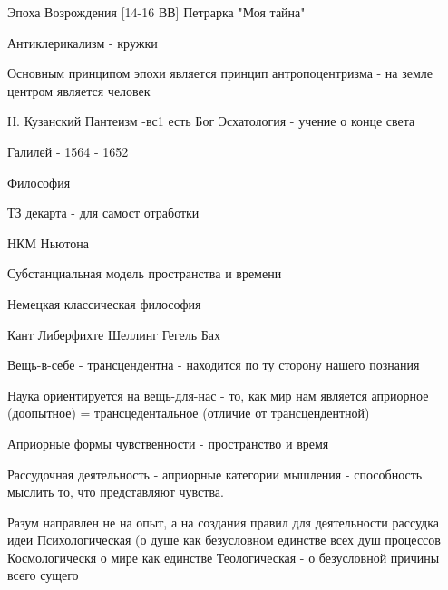 \documentclass[a4paper,12pt]{report}
\begin{document}
	Эпоха Возрождения [14-16 ВВ]
	Петрарка "Моя тайна"
	
	
	Антиклерикализм - кружки
	
	Основным принципом эпохи является принцип антропоцентризма - на земле центром является человек
	
	Н. Кузанский 
	Пантеизм -вс1 есть Бог
	Эсхатология - учение о конце света
	
	
	
	Галилей - 1564 - 1652
	
	Философия 
	
	ТЗ декарта  - для самост отработки
	
	
	НКМ Ньютона
	
	Субстанциальная модель пространства и времени
	
	
	Немецкая классическая философия
	
	Кант Либерфихте
	Шеллинг
	Гегель
	Бах
	
	
	Вещь-в-себе - трансцендентна - находится по ту сторону нашего познания
	
	Наука ориентируется на вещь-для-нас - то, как мир нам является
	априорное (доопытное) = трансцедентальное (отличие от трансцендентной)
	
	Априорные формы чувственности - пространство и время
	
	Рассудочная деятельность - априорные категории мышления - способность мыслить то, что представляют чувства.
	
	Разум направлен не на опыт, а на создания правил для деятельности рассудка
		идеи
		Психологическая (о душе как безусловном единстве всех душ процессов
			Космологическя о мире как единстве
			Теологическая  - о безусловной причины всего сущего 
			
		
	
\end{document}

